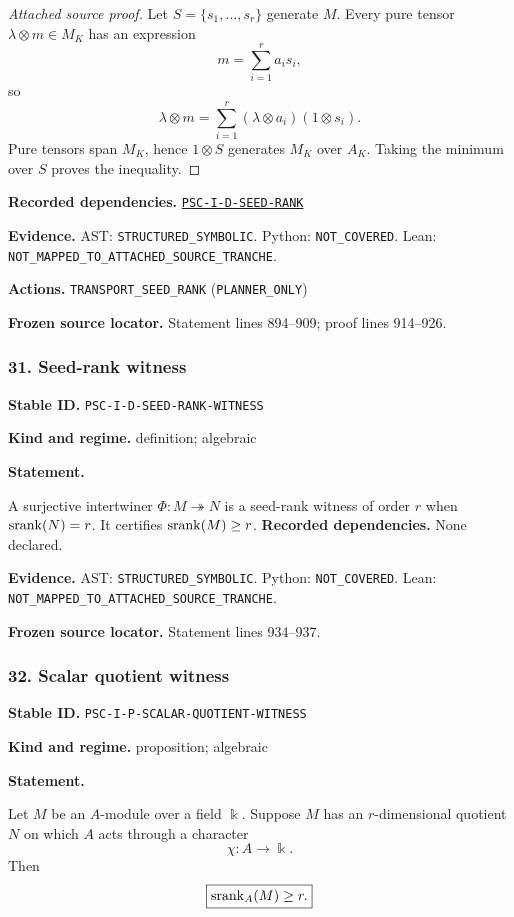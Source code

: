 \documentclass[a4paper,11pt]{article}
\newcommand{\bbk}{\Bbbk}\newcommand{\A}{\mathcal A}\newcommand{\B}{\mathcal B}\newcommand{\Ccal}{\mathcal C}\newcommand{\Pcal}{\mathcal P}\newcommand{\Qcal}{\mathcal Q}\newcommand{\Rcal}{\mathcal R}\newcommand{\Scal}{\mathcal S}
\newcommand{\field}[2]{\noindent\textbf{#1.} #2\par}
\begin{document}
\begin{proof}[Attached source proof]
Let \(S=\{s_1,\ldots,s_r\}\) generate \(M\).  Every pure tensor \(\lambda\otimes m\in M_K\) has an expression
\[
m=\sum_{i=1}^r a_is_i,
\]
so
\[
\lambda\otimes m
=
\sum_{i=1}^r(\lambda\otimes a_i)(1\otimes s_i).
\]
Pure tensors span \(M_K\), hence \(1\otimes S\) generates \(M_K\) over \(A_K\).  Taking the minimum over \(S\) proves the inequality.
\end{proof}
\field{Recorded dependencies}{\hyperref[rec:PSC-I-D-SEED-RANK]{\nolinkurl{PSC-I-D-SEED-RANK}}}
\field{Evidence}{AST: \nolinkurl{STRUCTURED_SYMBOLIC}. Python: \nolinkurl{NOT_COVERED}. Lean: \nolinkurl{NOT_MAPPED_TO_ATTACHED_SOURCE_TRANCHE}.}
\field{Actions}{\nolinkurl{TRANSPORT_SEED_RANK} (\nolinkurl{PLANNER_ONLY})}
\field{Frozen source locator}{Statement lines 894--909; proof lines 914--926.}
\subsubsection*{31. Seed-rank witness}
\label{rec:PSC-I-D-SEED-RANK-WITNESS}
\field{Stable ID}{\nolinkurl{PSC-I-D-SEED-RANK-WITNESS}}
\field{Kind and regime}{definition; algebraic}
\textbf{Statement.}\par
A surjective intertwiner $\Phi:M\twoheadrightarrow N$ is a seed-rank witness of order $r$ when $\operatorname{srank}(N)=r$.  It certifies $\operatorname{srank}(M)\geq r$.
\field{Recorded dependencies}{None declared.}
\field{Evidence}{AST: \nolinkurl{STRUCTURED_SYMBOLIC}. Python: \nolinkurl{NOT_COVERED}. Lean: \nolinkurl{NOT_MAPPED_TO_ATTACHED_SOURCE_TRANCHE}.}
\field{Frozen source locator}{Statement lines 934--937.}
\subsubsection*{32. Scalar quotient witness}
\label{rec:PSC-I-P-SCALAR-QUOTIENT-WITNESS}
\field{Stable ID}{\nolinkurl{PSC-I-P-SCALAR-QUOTIENT-WITNESS}}
\field{Kind and regime}{proposition; algebraic}
\textbf{Statement.}\par
Let $M$ be an $A$-module over a field $\bbk$.  Suppose $M$ has an $r$-dimensional quotient $N$ on which $A$ acts through a character
\[
\chi:A\longrightarrow\bbk.
\]
Then
\[
\boxed{\operatorname{srank}_A(M)\geq r.}
\]
\end{document}

